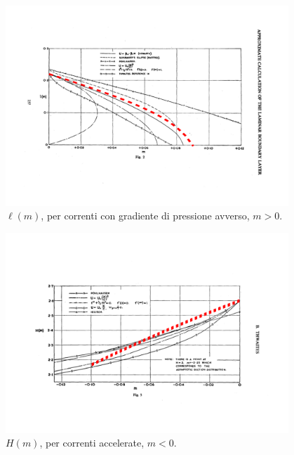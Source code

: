 \begin{figure}[h!]
\centering
 \includegraphics[width=0.95\textwidth, trim= 0  60 0 100, clip]{./../template/fig/cfr_ell_m_pos}
\caption{$\ell(m)$, per correnti con gradiente di pressione avverso, $m>0$.}\label{fig:ell_m_pos}
\end{figure}

\begin{figure}[h!]
\centering
 \includegraphics[width=0.95\textwidth, trim= 0 120 0 100, clip]{./../template/fig/cfr_H_m_neg}
\caption{$H(m)$, per correnti accelerate, $m<0$.}\label{fig:H_m_neg}
\end{figure}

